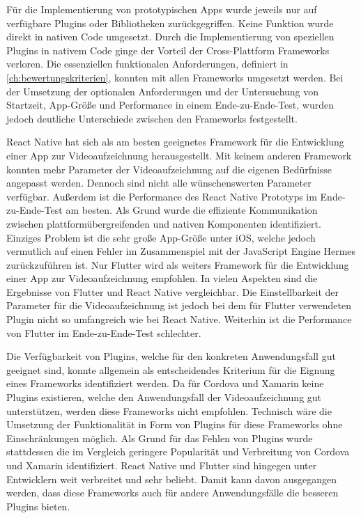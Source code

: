 Für die Implementierung von prototypischen Apps wurde jeweils nur auf verfügbare Plugins oder Bibliotheken zurückgegriffen.
Keine Funktion wurde direkt in nativen Code umgesetzt.
Durch die Implementierung von speziellen Plugins in nativem Code ginge der Vorteil der Cross-Plattform Frameworks verloren.
Die essenziellen funktionalen Anforderungen, definiert in \autoref{ch:bewertungskriterien}, konnten mit allen Frameworks umgesetzt werden.
Bei der Umsetzung der optionalen Anforderungen und der Untersuchung von Startzeit, App-Größe und Performance in einem Ende-zu-Ende-Test, wurden jedoch deutliche Unterschiede zwischen den Frameworks festgestellt.

React Native hat sich als am besten geeignetes Framework für die Entwicklung einer App zur Videoaufzeichnung herausgestellt.
Mit keinem anderen Framework konnten mehr Parameter der Videoaufzeichnung auf die eigenen Bedürfnisse angepasst werden.
Dennoch sind nicht alle wünschenswerten Parameter verfügbar.
Außerdem ist die Performance des React Native Prototyps im Ende-zu-Ende-Test am besten.
Als Grund wurde die effiziente Kommunikation zwischen plattformübergreifenden und nativen Komponenten identifiziert.
Einziges Problem ist die sehr große App-Größe unter iOS, welche jedoch vermutlich auf einen Fehler im Zusammenspiel mit der JavaScript Engine Hermes zurückzuführen ist.
Nur Flutter wird als weiters Framework für die Entwicklung einer App zur Videoaufzeichnung empfohlen.
In vielen Aspekten sind die Ergebnisse von Flutter und React Native vergleichbar.
Die Einstellbarkeit der Parameter für die Videoaufzeichnung ist jedoch bei dem für Flutter verwendeten Plugin nicht so umfangreich wie bei React Native.
Weiterhin ist die Performance von Flutter im Ende-zu-Ende-Test schlechter.

Die Verfügbarkeit von Plugins, welche für den konkreten Anwendungsfall gut geeignet sind, konnte allgemein als entscheidendes Kriterium für die Eignung eines Frameworks identifiziert werden.
Da für Cordova und Xamarin keine Plugins existieren, welche den Anwendungsfall der Videoaufzeichnung gut unterstützen, werden diese Frameworks nicht empfohlen.
Technisch wäre die Umsetzung der Funktionalität in Form von Plugins für diese Frameworks ohne Einschränkungen möglich.
Als Grund für das Fehlen von Plugins wurde stattdessen die im Vergleich geringere Popularität und Verbreitung von Cordova und Xamarin identifiziert.
React Native und Flutter sind hingegen unter Entwicklern weit verbreitet und sehr beliebt.
Damit kann davon ausgegangen werden, dass diese Frameworks auch für andere Anwendungsfälle die besseren Plugins bieten.


